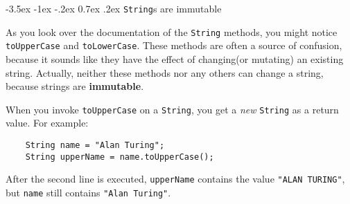 \documentclass{book}
\makeatletter
\renewcommand{\section}{\@startsection 
    {section} {1} {0mm}%
    {-3.5ex \@plus -1ex \@minus -.2ex}%
    {0.7ex \@plus.2ex}%
    {\normalfont\Large\bfseries}}
\makeatother
\begin{document}



%



\section{{\tt String}s are immutable}
\label{immutable}

As you look over the documentation of the {\tt String} methods, you
might notice {\tt toUpperCase} and {\tt toLowerCase}.  These
methods are often a source of confusion, because it sounds
like they have the effect of changing(or mutating) an
existing string.  Actually, neither these methods nor any
others can change a string, because strings are {\bf immutable}.

When you invoke {\tt toUpperCase} on a {\tt String}, you get a
{\em new} {\tt String} as a return value.  For example:

\begin{verbatim}
    String name = "Alan Turing";
    String upperName = name.toUpperCase();
\end{verbatim}
%
After the second line is executed, {\tt upperName} contains
the value {\tt "ALAN TURING"}, but {\tt name} still contains
{\tt "Alan Turing"}.
\end{document}
